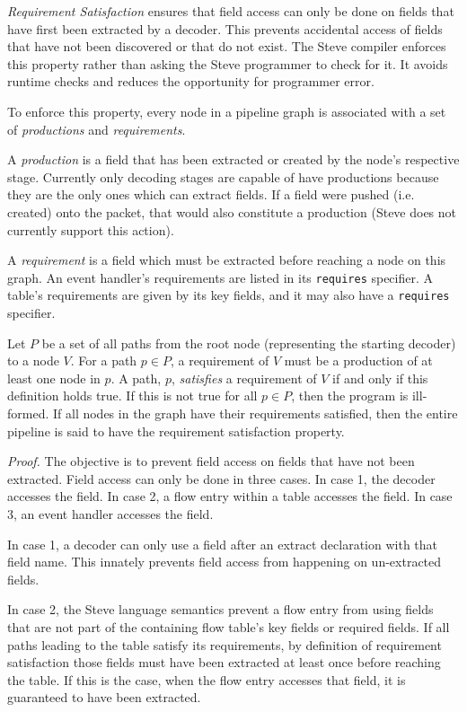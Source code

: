 \textit{Requirement Satisfaction} ensures that field access can only be done on fields that have first been extracted by a decoder. This prevents accidental access of fields that have not been discovered or that do not exist. The Steve compiler enforces this
property rather than asking the Steve programmer to check for it.
It avoids runtime checks and reduces the opportunity for programmer error.

To enforce this property, 
every node in a pipeline graph is associated with a set of \textit{productions} and \textit{requirements}.

A \textit{production} is a field that has been extracted or created by the node's respective stage. Currently only decoding stages are capable of have productions because they are the only ones which can extract fields. If a field were pushed (i.e. created) onto the packet, that would also constitute a production (Steve does not currently support this action).

A \emph{requirement} is a field which must be extracted before reaching a node on
this graph. An event handler's requirements are listed in its
\texttt{requires} specifier. A table's requirements are given by its
key fields, and it may also have a \texttt{requires} specifier.

Let $P$ be a set of all paths from the root node (representing the starting decoder) to a node $V$.
For a path $p \in P$, a requirement of $V$ must be a production of at least one node in
$p$. A path, $p$, \emph{satisfies} a requirement of $V$ if and only if this
definition holds true. If this is not true for all $p \in P$, then the program
is ill-formed. If all nodes in the graph have their requirements
satisfied, then the entire pipeline is said to have the requirement
satisfaction property.

\textit{Proof.} 
The objective is to prevent field access on fields that have not been extracted. Field access can only be done in three cases. In case 1, the decoder accesses the field.
In case 2, a flow entry within a table accesses the field. In case 3, an event
handler accesses the field.

In case 1, a decoder can only use a field after an extract declaration with
that field name. This innately prevents field access from happening on
un-extracted fields.

In case 2, the Steve language semantics prevent a flow entry from using
fields that are not part of the containing flow table's key fields or
required fields. If all paths leading to the table satisfy its requirements,
by definition of requirement satisfaction those fields must have been extracted at least once before
reaching the table. If this is the case, when the flow entry accesses that
field, it is guaranteed to have been extracted.

